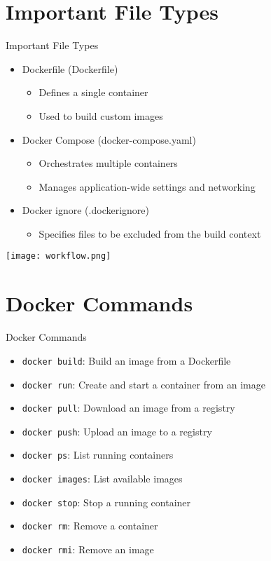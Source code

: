 \documentclass{beamer}
\begin{document}
\section{Important File Types}

\begin{frame}{Important File Types}
    \begin{itemize}
        \item Dockerfile (Dockerfile)
        \begin{itemize}
            \item Defines a single container
            \item Used to build custom images
        \end{itemize}
        \item Docker Compose (docker-compose.yaml)
        \begin{itemize}
            \item Orchestrates multiple containers
            \item Manages application-wide settings and networking
        \end{itemize}
        \item Docker ignore (.dockerignore)
        \begin{itemize}
            \item Specifies files to be excluded from the build context
        \end{itemize}
    \end{itemize}
    \texttt{[image: workflow.png]}
\end{frame}

\section{Docker Commands}

\begin{frame}{Docker Commands}
    \begin{itemize}
        \item \texttt{docker build}: Build an image from a Dockerfile
        \item \texttt{docker run}: Create and start a container from an image
        \item \texttt{docker pull}: Download an image from a registry
        \item \texttt{docker push}: Upload an image to a registry
        \item \texttt{docker ps}: List running containers
        \item \texttt{docker images}: List available images
        \item \texttt{docker stop}: Stop a running container
        \item \texttt{docker rm}: Remove a container
        \item \texttt{docker rmi}: Remove an image
    \end{itemize}
\end{frame}
\end{document}
